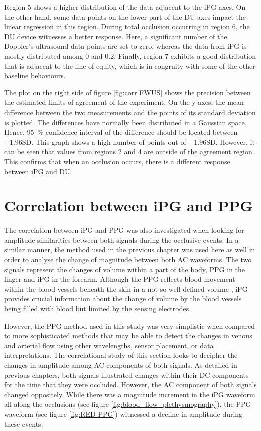 Region 5 shows a higher distribution of the data adjacent to the iPG axes. On the other hand, some data points on the lower part of the DU axes impact the linear regression in this region. During total occlusion occurring in region 6, the DU device witnesses a better response. Here, a significant number of the Doppler's ultrasound data points are set to zero, whereas the data from iPG is mostly distributed among 0 and 0.2. Finally, region 7 exhibits a good distribution that is adjacent to the line of equity, which is in congruity with some of the other baseline behaviours.

The plot on the right side of figure \ref{fig:corr FWUS} shows the precision between the estimated limits of agreement of the experiment.  On the y-axes, the mean difference between the two measurements and the points of its standard deviation is plotted. The differences have normally been distributed in a Gaussian space. Hence, \SI{95}{\percent} confidence interval of the difference should be located between $\pm 1.96$SD. This graph shows a high number of points out of $+ 1.96$SD. However, it can be seen that values from regions 2 and 4 are outside of the agreement region. This confirms that when an occlusion occurs, there is a different response between iPG and DU.


\section{Correlation between iPG and PPG}  %
\label{section correlation 3}
The correlation between iPG and PPG was also investigated when looking for amplitude similarities between both signals during the occlusive events. In a similar manner, the method used in the previous chapter was used here as well in order to analyse the change of magnitude between both AC waveforms. The two signals represent the changes of volume within a part of the body, PPG in the finger and iPG in the forearm. Although the PPG reflects blood movement within the blood vessels beneath the skin in a not so well-defined volume \cite{elgendi2012analysis}, iPG provides crucial information about the change of volume by the blood vessels being filled with blood but limited by the sensing electrodes.

However, the PPG method used in this study was very simplistic when compared to more sophisticated methods that may be able to detect the changes in venous and arterial flow using other wavelengths, sensor placement, or data interpretations. The correlational study of this section looks to decipher the changes in amplitude among AC components of both signals. As detailed in previous chapters, both signals illustrated changes within their DC components for the time that they were occluded. However, the AC component of both signals changed oppositely. While there was a magnitude increment in the iPG waveform all along the occlusions (see figure \ref{fig:blood_flow_plethysmography}), the PPG waveform (see figure \ref{fig:RED PPG}) witnessed a decline in amplitude during these events.


